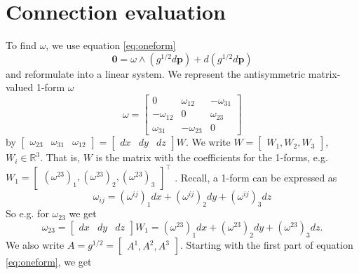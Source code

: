 \documentclass[../thesis.tex]{subfiles}
\begin{document}
\section{Connection evaluation}\label{sec:evaluation}
To find $\omega$, we use equation \ref{eq:oneform}
$$\bm{0} = \omega \wedge (g^{1/2}d\bm{p})+ d(g^{1/2}d\bm{p})$$
and reformulate into a linear system.
We represent the antisymmetric matrix-valued 1-form $\omega$
$$\omega = \begin{bmatrix}
 0 & \omega_{12} & -\omega_{31} \\
 -\omega_{12} & 0 & \omega_{23} \\
 \omega_{31} & -\omega_{23} & 0
\end{bmatrix}$$
by $
\begin{bmatrix}
  \omega_{23} & \omega_{31} & \omega_{12}
\end{bmatrix} = 
\begin{bmatrix}
  dx & dy & dz
\end{bmatrix} W$. We write $W=\begin{bmatrix}
  W_1,W_2,W_3
\end{bmatrix}$, $W_i \in \mathbb{R}^3$. That is, $W$ is the matrix with the coefficients for the 1-forms, e.g.
$W_1 = \begin{bmatrix}
  (\omega^{23})_1, (\omega^{23})_2, (\omega^{23})_3
\end{bmatrix}^{\top}$
.
Recall, a 1-form can be expressed as
$$
\omega_{ij}= (\omega^{ij})_1dx + (\omega^{ij})_2dy + (\omega^{ij})_3dz
$$
So e.g. for $\omega_{23}$ we get $$\omega_{23} = \begin{bmatrix}
  dx & dy & dz
\end{bmatrix}W_1 = (\omega^{23})_1dx + (\omega^{23})_2dy + (\omega^{23})_3dz.$$
We also write $A = g^{1/2}= \begin{bmatrix}
  A^1, A^2, A^3
\end{bmatrix}$.
Starting with the first part of equation \ref{eq:oneform}, we get
\end{document}
